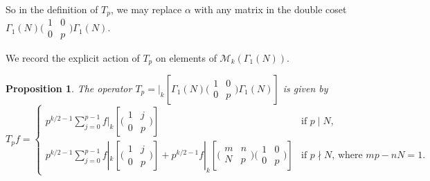 \documentclass[10pt,leqno,twoside]{article}
\theoremstyle{plain}
\newtheorem{proposition}[lem]{Proposition}
\theoremstyle{definition}
\numberwithin{equation}{section}
\numberwithin{lem}{section}
\begin{document}
So in the definition of $T_p$, we may replace $\alpha$ with any matrix in the double coset $\varGamma_1(N)\big(\!\begin{smallmatrix}
    1 & 0 \\ 0 & p
\end{smallmatrix}\!\big)\varGamma_1(N)$.

We record the explicit action of $T_p$ on elements of $\mathcal M_k(\varGamma_1(N))$.

\begin{proposition} 
    The operator $T_p = |_k[\varGamma_1(N)\big(\!\begin{smallmatrix}
        1 & 0 \\ 0 & p
    \end{smallmatrix}\!\big)\varGamma_1(N)]$ is given by 
    \[T_pf = \begin{cases}
        p^{k/2-1}\sum_{j=0}^{p-1} f|_k[\big(\!\begin{smallmatrix}
            1 & j \\ 0 & p
        \end{smallmatrix}\!\big)] & \text{if $p\mid N$,}\\
        p^{k/2-1}\sum_{j=0}^{p-1}f|_k[\big(\!\begin{smallmatrix}
            1 & j \\ 0 & p
        \end{smallmatrix}\!\big)] + p^{k/2-1}f|_k[\big(\!\begin{smallmatrix}
            m & n \\ N & p
        \end{smallmatrix}\!\big)\big(\!\begin{smallmatrix}
            1 & 0 \\ 0 & p
        \end{smallmatrix}\!\big)] & \text{if $p\nmid N$, where $mp-nN = 1$}.
    \end{cases}\]
\end{proposition}
\end{document}
